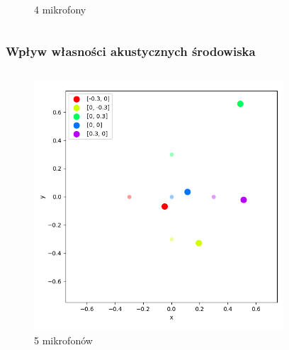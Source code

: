 \begin{frame}{}
\begin{columns}
\begin{column}{0.5\textwidth}
\begin{figure}
                \caption{4 mikrofony}
            \end{figure}
        \end{column}
    \end{columns}
\end{frame}

\begin{frame}{}
    \frametitle{Wpływ własności akustycznych środowiska}
    \begin{columns}
        \begin{column}{0.5\textwidth}
            \begin{figure}
                \centering
                \includegraphics[width=\textwidth]{../pics/mult_lat_2d_num/positions_5_mean.png}
                \caption{5 mikrofonów}
            \end{figure}
        \end{column}
        \begin{column}{0.5\textwidth}
            \begin{figure}
                \centering

\end{figure}
\end{column}
\end{columns}
\end{frame}

